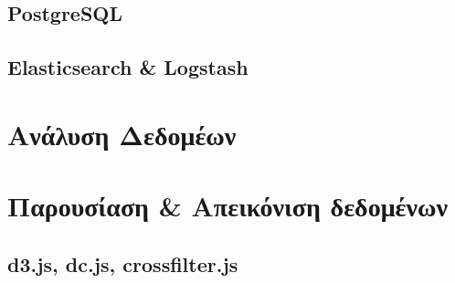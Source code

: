 \subsection{PostgreSQL}
\subsection{Elasticsearch \& Logstash}

\section{Ανάλυση Δεδομέων}

\section{Παρουσίαση \& Απεικόνιση δεδομένων}
\subsection{d3.js, dc.js, crossfilter.js}
